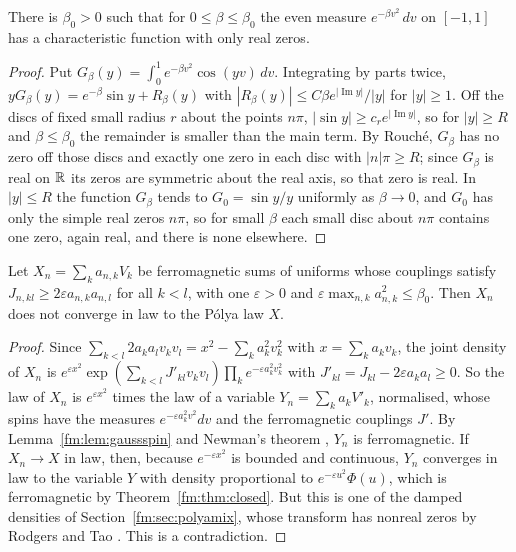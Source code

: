 \begin{lemma}[proved]\label{fm:lem:gaussspin}
There is $\beta_0>0$ such that for $0\le\beta\le\beta_0$ the even measure $e^{-\beta v^2}\,dv$ on $[-1,1]$ has a characteristic function with only real zeros.
\end{lemma}

\begin{proof}
Put $G_\beta(y)=\int_0^1e^{-\beta v^2}\cos(yv)\,dv$. Integrating by parts twice, $yG_\beta(y)=e^{-\beta}\sin y+R_\beta(y)$ with $|R_\beta(y)|\le C\beta e^{|\operatorname{Im}y|}/|y|$ for $|y|\ge1$. Off the discs of fixed small radius $r$ about the points $n\pi$, $|\sin y|\ge c_re^{|\operatorname{Im}y|}$, so for $|y|\ge R$ and $\beta\le\beta_0$ the remainder is smaller than the main term. By Rouch\'e, $G_\beta$ has no zero off those discs and exactly one zero in each disc with $|n|\pi\ge R$; since $G_\beta$ is real on $\mathbb{R}$ its zeros are symmetric about the real axis, so that zero is real. In $|y|\le R$ the function $G_\beta$ tends to $G_0=\sin y/y$ uniformly as $\beta\to0$, and $G_0$ has only the simple real zeros $n\pi$, so for small $\beta$ each small disc about $n\pi$ contains one zero, again real, and there is none elsewhere.
\end{proof}

\begin{theorem}[proved]\label{fm:thm:dense}
Let $X_n=\sum_ka_{n,k}V_k$ be ferromagnetic sums of uniforms whose couplings satisfy $J_{n,kl}\ge2\varepsilon a_{n,k}a_{n,l}$ for all $k<l$, with one $\varepsilon>0$ and $\varepsilon\max_{n,k}a_{n,k}^2\le\beta_0$. Then $X_n$ does not converge in law to the P\'olya law $X$.
\end{theorem}

\begin{proof}
Since $\sum_{k<l}2a_ka_lv_kv_l=x^2-\sum_ka_k^2v_k^2$ with $x=\sum_ka_kv_k$, the joint density of $X_n$ is $e^{\varepsilon x^2}\exp(\sum_{k<l}J'_{kl}v_kv_l)\prod_ke^{-\varepsilon a_k^2v_k^2}$ with $J'_{kl}=J_{kl}-2\varepsilon a_ka_l\ge0$. So the law of $X_n$ is $e^{\varepsilon x^2}$ times the law of a variable $Y_n=\sum_ka_kV'_k$, normalised, whose spins have the measures $e^{-\varepsilon a_k^2v^2}dv$ and the ferromagnetic couplings $J'$. By Lemma~\ref{fm:lem:gaussspin} and Newman's theorem \cite{Newman74}, $Y_n$ is ferromagnetic. If $X_n\to X$ in law, then, because $e^{-\varepsilon x^2}$ is bounded and continuous, $Y_n$ converges in law to the variable $Y$ with density proportional to $e^{-\varepsilon u^2}\Phi(u)$, which is ferromagnetic by Theorem~\ref{fm:thm:closed}. But this is one of the damped densities of Section~\ref{fm:sec:polyamix}, whose transform has nonreal zeros by Rodgers and Tao \cite{RodgersTao}. This is a contradiction.
\end{proof}

